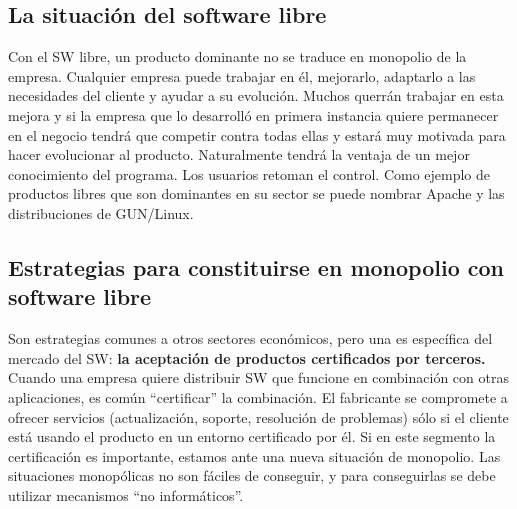 \subsection{La situación del software libre}

Con el SW libre, un producto dominante no se traduce en monopolio de la empresa. Cualquier empresa puede trabajar en él, mejorarlo, adaptarlo a las necesidades del cliente y ayudar a su evolución. Muchos querrán trabajar en esta mejora y si la empresa que lo desarrolló en primera instancia quiere permanecer en el negocio tendrá que competir contra todas ellas y estará muy motivada para hacer evolucionar al producto. Naturalmente tendrá la ventaja de un mejor conocimiento del programa. 
Los usuarios retoman el control.
Como ejemplo de productos libres que son dominantes en su sector se puede nombrar Apache y las distribuciones de GUN/Linux.

\subsection{Estrategias para constituirse en monopolio con software libre}

Son estrategias comunes a otros sectores económicos, pero una es específica del mercado del SW: {\bf la aceptación de productos certificados por terceros.}
Cuando una empresa quiere distribuir SW que funcione en combinación con otras aplicaciones, es común “certificar” la combinación. El fabricante se compromete a ofrecer servicios (actualización, soporte, resolución de problemas) sólo si el cliente está usando el producto en un entorno certificado por él. Si en este segmento la certificación es importante, estamos ante una nueva situación de monopolio.
Las situaciones monopólicas no son fáciles de conseguir, y para conseguirlas se debe utilizar mecanismos “no informáticos”.



